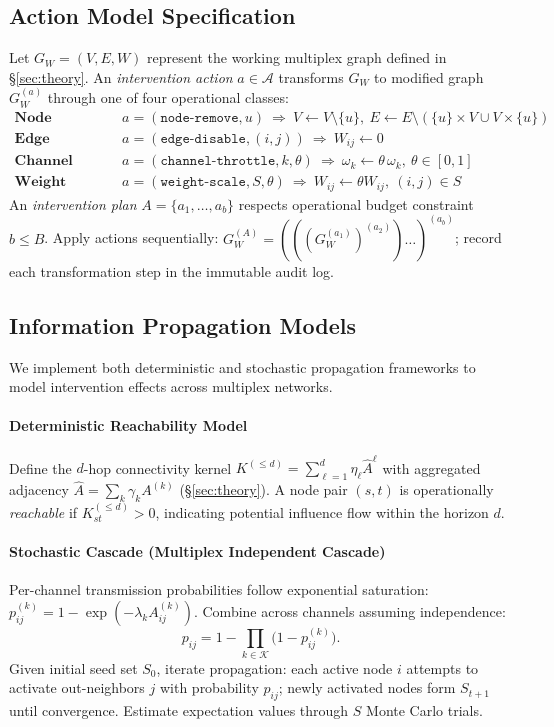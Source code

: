\documentclass[12pt]{article}
\theoremstyle{plain}
\begin{document}
\subsection{Action Model Specification}
Let $G_W=(V,E,W)$ represent the working multiplex graph defined in §\ref{sec:theory}. An \emph{intervention action} $a\in\mathcal{A}$ transforms $G_W$ to modified graph $G_W^{(a)}$ through one of four operational classes:
\begin{align*}
\textbf{Node Removal: }& a=(\texttt{node-remove},u)\ \Rightarrow\ V\!\leftarrow\!V\setminus\{u\},\ E\!\leftarrow\!E\setminus(\{u\}\times V\cup V\times\{u\})\\
\textbf{Edge Disablement: }& a=(\texttt{edge-disable},(i,j))\ \Rightarrow\ W_{ij}\!\leftarrow\!0\\
\textbf{Channel Throttling: }& a=(\texttt{channel-throttle},k,\theta)\ \Rightarrow\ \omega_k\!\leftarrow\!\theta\,\omega_k,\ \theta\in[0,1]\\
\textbf{Weight Scaling: }& a=(\texttt{weight-scale},S,\theta)\ \Rightarrow\ W_{ij}\!\leftarrow\!\theta W_{ij},\ (i,j)\in S
\end{align*}
An \emph{intervention plan} $A=\{a_1,\dots,a_b\}$ respects operational budget constraint $b\le B$. Apply actions sequentially: $G_W^{(A)}=(((G_W^{(a_1)})^{(a_2)})\dots)^{(a_b)}$; record each transformation step in the immutable audit log.

\subsection{Information Propagation Models}
We implement both deterministic and stochastic propagation frameworks to model intervention effects across multiplex networks.

\paragraph{Deterministic Reachability Model}
Define the $d$-hop connectivity kernel $K^{(\le d)}=\sum_{\ell=1}^{d}\eta_\ell\widehat{A}^{\ell}$ with aggregated adjacency $\widehat{A}=\sum_k\gamma_k A^{(k)}$ (§\ref{sec:theory}). A node pair $(s,t)$ is operationally \emph{reachable} if $K^{(\le d)}_{st}>0$, indicating potential influence flow within the horizon $d$.

\paragraph{Stochastic Cascade (Multiplex Independent Cascade)}
Per-channel transmission probabilities follow exponential saturation: $p^{(k)}_{ij}=1-\exp(-\lambda_k A^{(k)}_{ij})$. Combine across channels assuming independence:
\[
p_{ij}=1-\prod_{k\in\mathcal{K}}\big(1-p^{(k)}_{ij}\big).
\]
Given initial seed set $S_0$, iterate propagation: each active node $i$ attempts to activate out-neighbors $j$ with probability $p_{ij}$; newly activated nodes form $S_{t+1}$ until convergence. Estimate expectation values through $S$ Monte Carlo trials.
\end{document}
